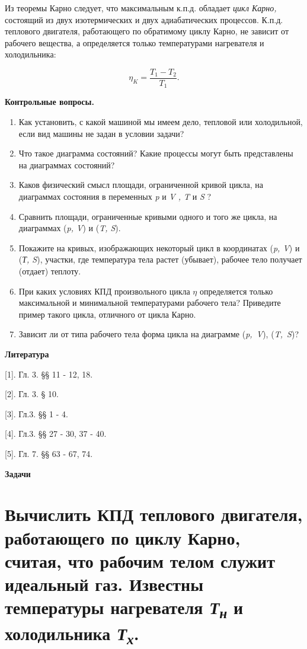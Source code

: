 Из теоремы Карно следует, что максимальным к.п.д. обладает \emph{цикл
Карно,} состоящий из двух изотермических и двух адиабатических
процессов. К.п.д. теплового двигателя, работающего по обратимому циклу
Карно, не зависит от рабочего вещества, а определяется только
температурами нагревателя и холодильника:

\begin{equation}
  \eta_K = \frac{T_1 - T_2}{T_1}.
\end{equation}

\textbf{Контрольные вопросы.}
\begin{enumerate}
  \item Как установить, с какой машиной мы имеем дело, тепловой или
  холодильной, если вид машины не задан в условии задачи?
  \item Что такое диаграмма состояний? Какие процессы могут быть представлены
  на диаграммах состояний?
  \item Каков физический смысл площади, ограниченной кривой цикла, на
  диаграммах состояния в переменных \emph{p} и \emph{V , T} и \emph{S} ?
  \item Сравнить площади, ограниченные кривыми одного и того же цикла, на
  диаграммах (\emph{p, V}) и (\emph{T, S}).
  \item Покажите на кривых, изображающих некоторый цикл в координатах (\emph{p, V}) и (\emph{Т, S}), участки, где температура тела растет (убывает), рабочее тело получает (отдает) теплоту.
  \item При каких условиях КПД произвольного цикла $\eta$ определяется только
  максимальной и минимальной температурами рабочего тела? Приведите
  пример такого цикла, отличного от цикла Карно.
  \item Зависит ли от типа рабочего тела форма цикла на диаграмме (\emph{p,~V}), (\emph{T,~S})?
\end{enumerate}


\textbf{Литература}

{[}1{]}. Гл. 3. §§ 11 - 12, 18.

{[}2{]}. Гл. 3. § 10.

{[}3{]}. Гл.3. §§ 1 - 4.

{[}4{]}. Гл.3. §§ 27 - 30, 37 - 40.

{[}5{]}. Гл. 7. §§ 63 - 67, 74.

\textbf{Задачи}

\section{Вычислить КПД теплового двигателя, работающего по циклу
Карно, считая, что рабочим телом служит идеальный газ. Известны
температуры нагревателя \emph{Т\textsubscript{н}} и холодильника
\emph{Т\textsubscript{х}}.}

